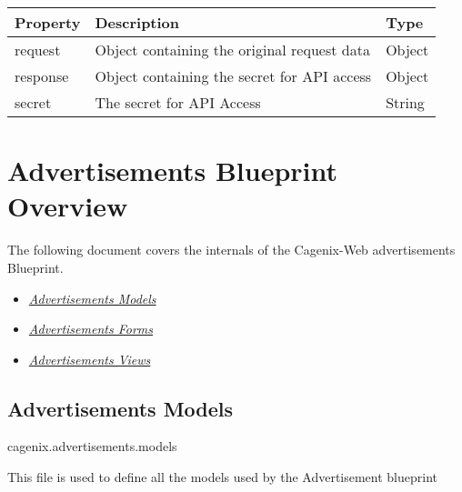 \documentclass[letterpaper,10pt,english]{sphinxmanual}
\begin{document}
\begin{tabulary}{\linewidth}{|L|L|L|}
\hline
\textsf{\relax 
Property
} & \textsf{\relax 
Description
} & \textsf{\relax 
Type
}\\
\hline
request
 & 
Object containing the original
request data
 & 
Object
\\

response
 & 
Object containing the secret for
API access
 & 
Object
\\

secret
 & 
The secret for API Access
 & 
String
\\
\hline\end{tabulary}



\chapter{Advertisements Blueprint Overview}
\label{dev-advertisements::doc}\label{dev-advertisements:advertisements-blueprint-overview}
The following document covers the internals of the Cagenix-Web advertisements
Blueprint.
\begin{itemize}
\item {} 
{\hyperref[dev-advertisements:advertisements-models-label]{\emph{Advertisements Models}}}

\item {} 
{\hyperref[dev-advertisements:advertisements-forms-label]{\emph{Advertisements Forms}}}

\item {} 
{\hyperref[dev-advertisements:advertisements-views-label]{\emph{Advertisements Views}}}

\end{itemize}


\section{Advertisements Models}
\label{dev-advertisements:advertisements-models}\label{dev-advertisements:module-cagenix.advertisements.models}\label{dev-advertisements:advertisements-models-label}
cagenix.advertisements.models

This file is used to define all the models used by the Advertisement blueprint
\end{document}
